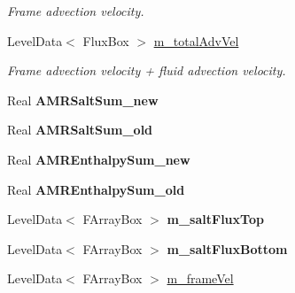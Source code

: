 \begin{DoxyCompactItemize}
\begin{DoxyCompactList}\small\item\em Frame advection velocity. \end{DoxyCompactList}\item 
\hypertarget{class_a_m_r_level_mushy_layer_a6bba1599c6385bfc52087d65d83e2485}{Level\-Data$<$ Flux\-Box $>$ \hyperlink{class_a_m_r_level_mushy_layer_a6bba1599c6385bfc52087d65d83e2485}{m\-\_\-total\-Adv\-Vel}}\label{class_a_m_r_level_mushy_layer_a6bba1599c6385bfc52087d65d83e2485}

\begin{DoxyCompactList}\small\item\em Frame advection velocity + fluid advection velocity. \end{DoxyCompactList}\item 
\hypertarget{class_a_m_r_level_mushy_layer_a40949c8df12b362facb7aa3f1d879cf6}{Real {\bfseries A\-M\-R\-Salt\-Sum\-\_\-new}}\label{class_a_m_r_level_mushy_layer_a40949c8df12b362facb7aa3f1d879cf6}

\item 
\hypertarget{class_a_m_r_level_mushy_layer_a9e9671d353d9bdf3e9be0bdbb06bc2be}{Real {\bfseries A\-M\-R\-Salt\-Sum\-\_\-old}}\label{class_a_m_r_level_mushy_layer_a9e9671d353d9bdf3e9be0bdbb06bc2be}

\item 
\hypertarget{class_a_m_r_level_mushy_layer_a2826cb43a2acbc06d05ea5625aed4263}{Real {\bfseries A\-M\-R\-Enthalpy\-Sum\-\_\-new}}\label{class_a_m_r_level_mushy_layer_a2826cb43a2acbc06d05ea5625aed4263}

\item 
\hypertarget{class_a_m_r_level_mushy_layer_abc6821ef9d09fddf0cd3e55fc0bb349d}{Real {\bfseries A\-M\-R\-Enthalpy\-Sum\-\_\-old}}\label{class_a_m_r_level_mushy_layer_abc6821ef9d09fddf0cd3e55fc0bb349d}

\item 
\hypertarget{class_a_m_r_level_mushy_layer_a89f01be36bc140aaac63f16a74aa6e9a}{Level\-Data$<$ F\-Array\-Box $>$ {\bfseries m\-\_\-salt\-Flux\-Top}}\label{class_a_m_r_level_mushy_layer_a89f01be36bc140aaac63f16a74aa6e9a}

\item 
\hypertarget{class_a_m_r_level_mushy_layer_a3019ebcb233c3bdb4f1646e1f1022221}{Level\-Data$<$ F\-Array\-Box $>$ {\bfseries m\-\_\-salt\-Flux\-Bottom}}\label{class_a_m_r_level_mushy_layer_a3019ebcb233c3bdb4f1646e1f1022221}

\item 
\hypertarget{class_a_m_r_level_mushy_layer_a519fbccec0b9fa2dff32d9040c7d579d}{Level\-Data$<$ F\-Array\-Box $>$ \hyperlink{class_a_m_r_level_mushy_layer_a519fbccec0b9fa2dff32d9040c7d579d}{m\-\_\-frame\-Vel}}\label{class_a_m_r_level_mushy_layer_a519fbccec0b9fa2dff32d9040c7d579d}


\end{DoxyCompactItemize}
